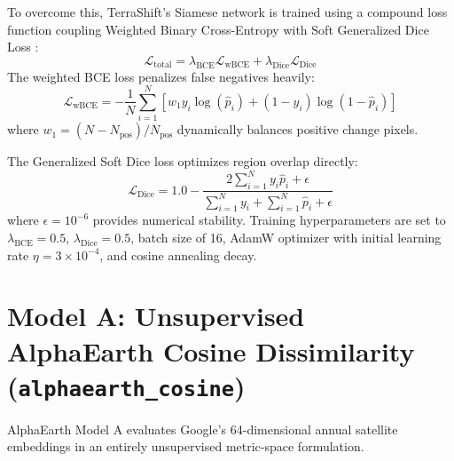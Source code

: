 To overcome this, TerraShift's Siamese network is trained using a compound loss function coupling Weighted Binary Cross-Entropy with Soft Generalized Dice Loss \citep{sudre2017generalised}:
\begin{equation}
    \mathcal{L}_{\text{total}} = \lambda_{\text{BCE}} \mathcal{L}_{\text{wBCE}} + \lambda_{\text{Dice}} \mathcal{L}_{\text{Dice}}
    \label{eq:compound_loss}
\end{equation}
The weighted BCE loss penalizes false negatives heavily:
\begin{equation}
    \mathcal{L}_{\text{wBCE}} = -\frac{1}{N} \sum_{i=1}^N \left[ w_1 y_i \log(\hat{p}_i) + (1 - y_i) \log(1 - \hat{p}_i) \right]
    \label{eq:weighted_bce}
\end{equation}
where $w_1 = (N - N_{\text{pos}}) / N_{\text{pos}}$ dynamically balances positive change pixels.

The Generalized Soft Dice loss optimizes region overlap directly:
\begin{equation}
    \mathcal{L}_{\text{Dice}} = 1.0 - \frac{2 \sum_{i=1}^N y_i \hat{p}_i + \epsilon}{\sum_{i=1}^N y_i + \sum_{i=1}^N \hat{p}_i + \epsilon}
    \label{eq:soft_dice}
\end{equation}
where $\epsilon = 10^{-6}$ provides numerical stability. Training hyperparameters are set to $\lambda_{\text{BCE}} = 0.5$, $\lambda_{\text{Dice}} = 0.5$, batch size of 16, AdamW optimizer with initial learning rate $\eta = 3 \times 10^{-4}$, and cosine annealing decay.

\section{Model A: Unsupervised AlphaEarth Cosine Dissimilarity (\texttt{alphaearth\_cosine})}
\label{sec:ai_model_a}
AlphaEarth Model A evaluates Google's 64-dimensional annual satellite embeddings in an entirely unsupervised metric-space formulation.

